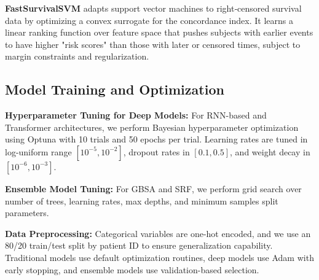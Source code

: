 \textbf{FastSurvivalSVM} adapts support vector machines to right‐censored survival data by optimizing a convex surrogate for the concordance index. It learns a linear ranking function over feature space that pushes subjects with earlier events to have higher "risk scores" than those with later or censored times, subject to margin constraints and regularization.

\subsection{Model Training and Optimization}

\textbf{Hyperparameter Tuning for Deep Models:} For RNN-based and Transformer architectures, we perform Bayesian hyperparameter optimization using Optuna with 10 trials and 50 epochs per trial. Learning rates are tuned in log-uniform range $[10^{-5}, 10^{-2}]$, dropout rates in $[0.1, 0.5]$, and weight decay in $[10^{-6}, 10^{-3}]$.

\textbf{Ensemble Model Tuning:} For GBSA and SRF, we perform grid search over number of trees, learning rates, max depths, and minimum samples split parameters.

\textbf{Data Preprocessing:} Categorical variables are one-hot encoded, and we use an 80/20 train/test split by patient ID to ensure generalization capability. Traditional models use default optimization routines, deep models use Adam with early stopping, and ensemble models use validation-based selection.